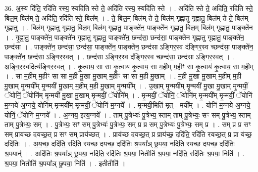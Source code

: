 \documentclass[17pt]{extarticle}
\begin{document}
36. अ॒स्य दि॑ति॒ रदि॑ति रस्य॒ स्यदि॑ति स्ते ते॒ अदि॑ति रस्य॒ स्यदि॑ति स्ते । . अदि॑ति स्ते ते॒ अदि॑ति॒ रदि॑ति स्ते॒ बिल॒म् बिल॑म् ते॒ अदि॑ति॒ रदि॑ति स्ते॒ बिल᳚म् । . ते॒ बिल॒म् बिल॑म् ते ते॒ बिल॑म् गृह्णातु गृह्णातु॒ बिल॑म् ते ते॒ बिल॑म् गृह्णातु । . बिल॑म् गृह्णातु गृह्णातु॒ बिल॒म् बिल॑म् गृह्णातु॒ पाङ्क्ते॑न॒ पाङ्क्ते॑न गृह्णातु॒ बिल॒म् बिल॑म् गृह्णातु॒ पाङ्क्ते॑न । . गृ॒ह्णा॒तु॒ पाङ्क्ते॑न॒ पाङ्क्ते॑न गृह्णातु गृह्णातु॒ पाङ्क्ते॑न॒ छन्द॑सा॒ छन्द॑सा॒ पाङ्क्ते॑न गृह्णातु गृह्णातु॒ पाङ्क्ते॑न॒ छन्द॑सा । . पाङ्क्ते॑न॒ छन्द॑सा॒ छन्द॑सा॒ पाङ्क्ते॑न॒ पाङ्क्ते॑न॒ छन्द॑सा ऽङ्गिर॒स्व द॑ङ्गिर॒स्व च्छन्द॑सा॒ पाङ्क्ते॑न॒ पाङ्क्ते॑न॒ छन्द॑सा ऽङ्गिर॒स्वत् । . छन्द॑सा ऽङ्गिर॒स्व द॑ङ्गिर॒स्व च्छन्द॑सा॒ छन्द॑सा ऽङ्गिर॒स्वत् । . अ॒ङ्गि॒र॒स्वदित्य॑ङ्गिर॒स्वत् । . कृ॒त्वाय॒ सा सा कृ॒त्वाय॑ कृ॒त्वाय॒ सा म॒हीम् म॒हीꣳ सा कृ॒त्वाय॑ कृ॒त्वाय॒ सा म॒हीम् । . सा म॒हीम् म॒हीꣳ सा सा म॒ही मु॒खा मु॒खाम् म॒हीꣳ सा सा म॒ही मु॒खाम् । . म॒ही मु॒खा मु॒खाम् म॒हीम् म॒ही मु॒खाम् मृ॒न्मयी᳚म् मृ॒न्मयी॑ मु॒खाम् म॒हीम् म॒ही मु॒खाम् मृ॒न्मयी᳚म् । . उ॒खाम् मृ॒न्मयी᳚म् मृ॒न्मयी॑ मु॒खा मु॒खाम् मृ॒न्मयीं॒ ॅयोनिं॒ ॅयोनि॑म् मृ॒न्मयी॑ मु॒खा मु॒खाम् मृ॒न्मयीं॒ ॅयोनि᳚म् । . मृ॒न्मयीं॒ ॅयोनिं॒ ॅयोनि॑म् मृ॒न्मयी᳚म् मृ॒न्मयीं॒ ॅयोनि॑ म॒ग्नये॑ अ॒ग्नये॒ योनि॑म् मृ॒न्मयी᳚म् मृ॒न्मयीं॒ ॅयोनि॑ म॒ग्नये᳚ । . मृ॒न्मयी॒मिति॑ मृत् - मयी᳚म् । . योनि॑ म॒ग्नये॑ अ॒ग्नये॒ योनिं॒ ॅयोनि॑ म॒ग्नये᳚ । . अ॒ग्नय॒ इत्य॒ग्नये᳚ । . ताम् पु॒त्रेभ्यः॑ पु॒त्रेभ्य॒ स्ताम् ताम् पु॒त्रेभ्यः॒ सꣳ सम् पु॒त्रेभ्य॒ स्ताम् ताम् पु॒त्रेभ्यः॒ सम् । . पु॒त्रेभ्यः॒ सꣳ सम् पु॒त्रेभ्यः॑ पु॒त्रेभ्यः॒ सम् प्र प्र सम् पु॒त्रेभ्यः॑ पु॒त्रेभ्यः॒ सम् प्र । . सम् प्र प्र सꣳ सम् प्राय॑च्छ दयच्छ॒त् प्र सꣳ सम् प्राय॑च्छत् । . प्राय॑च्छ दयच्छ॒त् प्र प्राय॑च्छ॒ ददि॑ति॒ रदि॑ति रयच्छ॒त् प्र प्रा य॑च्छ॒ ददि॑तिः । . अ॒य॒च्छ॒ ददि॑ति॒ रदि॑ति रयच्छ दयच्छ॒ ददि॑तिः श्र॒पया᳚ञ् छ्र॒पया॒ नदि॑ति रयच्छ दयच्छ॒ ददि॑तिः श्र॒पयान्॑ । . अदि॑तिः श्र॒पया᳚ञ् छ्र॒पया॒ नदि॑ति॒ रदि॑तिः श्र॒पया॒ नितीति॑ श्र॒पया॒ नदि॑ति॒ रदि॑तिः श्र॒पया॒ निति॑ । . श्र॒पया॒ नितीति॑ श्र॒पया᳚ञ् छ्र॒पया॒ निति॑ । . इतीतीति॑ । \newline
\pagebreak
{}
\end{document}

